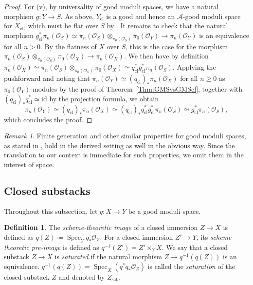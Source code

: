 \documentclass[a4paper,twoside,11pt]{amsart}
\theoremstyle{plain}
\theoremstyle{definition}
\newtheorem{definition}[theorem]{Definition}
\theoremstyle{remark}
\newtheorem{remark}[theorem]{Remark}
\numberwithin{equation}{section}
\newcommand{\id}{\mathrm{id}} %
\newcommand\sA{\mathcal{A}}
\DeclareMathOperator{\Spec}{Spec} %
\newcommand{\cl}{\mathrm{cl}} %
\newcommand{\oO}{\mathcal{O}}
\begin{document}
\begin{proof}
    For (v), by universality of good moduli spaces, we have a natural morphism $g \colon Y \to S$. As above, $Y_\cl$ is a good and hence an $\sA$-good moduli space for $X_\cl$, which must be flat over $S$ by \cite[Theorem~4.16]{AlperGood}. It remains to check that the natural morphism $g_\cl^\ast \pi_n(\oO_S) \simeq \pi_n(\oO_S) \otimes_{\pi_0(\oO_S)} \pi_0(\oO_Y) \to \pi_n(\oO_Y)$ is an equivalence for all $n > 0$. By the flatness of $X$ over $S$, this is the case for the morphism $\pi_n(\oO_S) \otimes_{\pi_0(\oO_S)} \pi_0(\oO_X) \to \pi_n(\oO_X)$. We then have by definition $\pi_n(\oO_X) \simeq \pi_n(\oO_S) \otimes_{\pi_0(\oO_S)} \pi_0(\oO_X) \simeq q_\cl^\ast g_\cl^\ast \pi_n(\oO_S)$. Applying the pushforward and noting that $\pi_n(\oO_Y) \simeq (q_\cl)_\ast \pi_n(\oO_X)$ for all $n \geq 0$ as $\pi_0(\oO_Y)$-modules by the proof of Theorem~\ref{Thm:GMSvsGMScl}, together with $(q_\cl)_\ast q_\cl^\ast \simeq \id$ by the projection formula, we obtain
    $$ \pi_n(\oO_Y) \simeq (q_\cl)_\ast \pi_n(\oO_X) \simeq (q_\cl)_\ast q_\cl^{\ast} g_\cl^\ast \pi_n(\oO_S) \simeq g_\cl^\ast \pi_n(\oO_S),$$
    which concludes the proof.
\end{proof}

\begin{remark}
    Finite generation and other similar properties for good moduli spaces, as stated in \cite[Theorem~4.16]{AlperGood}, hold in the derived setting as well in the obvious way. Since the translation to our context is immediate for such properties, we omit them in the interest of space.
\end{remark}

\subsection{Closed substacks}
Throughout this subsection, let $q \colon X \to Y$ be a good moduli space.
\begin{definition} \label{def: saturated closed substack}
     The \emph{scheme-theoretic image} of a closed immersion $Z \to X$ is defined as $q(Z) \coloneqq \Spec_Y q_* \oO_Z$. For a closed immersion $Z' \to Y$, its \emph{scheme-theoretic pre-image} is defined as $q^{-1}(Z') = Z' \times_Y X$. We say that a closed substack $Z \to X$ is \emph{saturated} if the natural morphism $Z \to q^{-1}(q(Z))$ is an equivalence. $q^{-1}(q(Z)) = \Spec_X (q^\ast q_\ast \oO_Z)$ is called the \emph{saturation} of the closed substack $Z$ and denoted by $Z_{\mathrm{sat}}$.
\end{definition}
\end{document}
